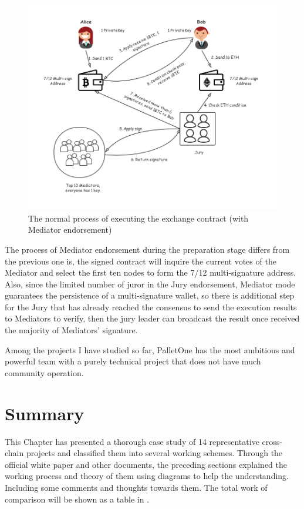 \begin{figure}[H]
    \includegraphics[width=1\textwidth]{./figures/mediator.png}
    \centering
    \caption{The normal process of executing the exchange contract (with Mediator endorsement) }
    \label{fig:mediator}
    \centering
\end{figure}
\noindent The process of Mediator endorsement during the preparation stage differs from the previous one is, the signed contract will inquire the current votes of the Mediator and select the first ten nodes to form the 7/12 multi-signature address. Also, since the limited number of juror in the Jury endorsement, Mediator mode guarantees the persistence of a multi-signature wallet, so there is additional step for the Jury that has already reached the consensus to send the execution results to Mediators to verify, then the jury leader can broadcast the result once received the majority of Mediators' signature.

\noindent Among the projects I have studied so far, PalletOne has the most ambitious and powerful team with a purely technical project that does not have much community operation.






\section{Summary}
\noindent This Chapter has presented a thorough case study of 14 representative cross-chain projects and classified them into several working schemes. Through the official white paper and other documents, the preceding sections explained the working process and theory of them using diagrams to help the understanding. Including some comments and thoughts towards them. The total work of comparison will be shown as a table in .


%